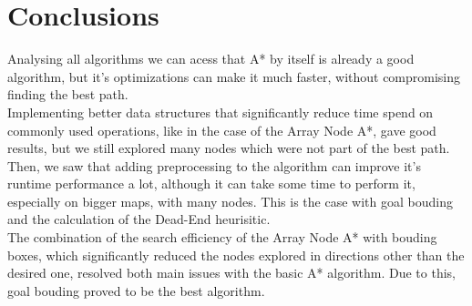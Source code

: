 \documentclass{article}
\begin{document}
  \section{Conclusions}
  Analysing all algorithms we can acess that A* by itself is already a good algorithm, but it's optimizations can make it much faster, 
  without compromising finding the best path.\\
  Implementing better data structures that significantly reduce time spend on commonly used operations, like in the case of the Array Node A*, 
  gave good results, but we still explored many nodes which were not part of the best path.\\
  Then, we saw that adding preprocessing to the algorithm can improve it's runtime performance a lot, although it can take some time to perform it, 
  especially on bigger maps, with many nodes. This is the case with goal bouding and the calculation of the Dead-End heurisitic.\\
  The combination of the search efficiency of the Array Node A* with bouding boxes, which significantly reduced the nodes explored 
  in directions other than the desired one, resolved both main issues with the basic A* algorithm. Due to this, goal bouding proved to be the best algorithm.
\end{document}
